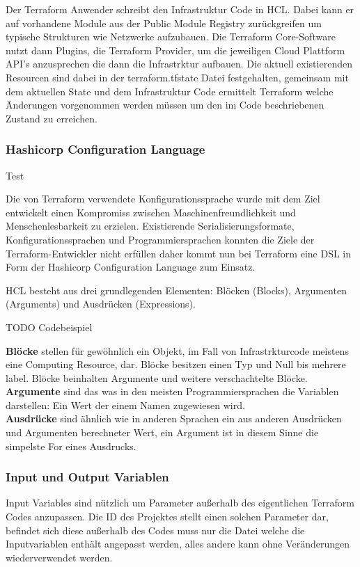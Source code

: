 \begin{spacing}{1.2}
Der Terraform Anwender schreibt den Infrastruktur Code in HCL. Dabei kann
er auf vorhandene Module aus der Public Module Registry zurückgreifen um
typische Strukturen wie Netzwerke aufzubauen. Die Terraform Core-Software
nutzt dann Plugins, die Terraform Provider, um die jeweiligen Cloud Plattform
API's anzusprechen die dann die Infrastrktur aufbauen. Die aktuell
existierenden Resourcen sind dabei in der terraform.tfstate Datei
festgehalten, gemeinsam mit dem aktuellen State und dem Infrastruktur Code
ermittelt Terraform welche Änderungen vorgenommen werden müssen um den
im Code beschriebenen Zustand zu erreichen.

\subsubsection{Hashicorp Configuration Language}

Test

Die von Terraform verwendete Konfigurationssprache wurde mit dem Ziel
entwickelt einen Kompromiss zwischen Maschinenfreundlichkeit und
Menschenlesbarkeit zu erzielen. Existierende Serialisierungsformate,
Konfigurationssprachen und Programmiersprachen konnten die Ziele
der Terraform-Entwickler nicht erfüllen daher kommt nun bei Terraform
eine DSL in Form der Hashicorp Configuration Language zum Einsatz.

HCL besteht aus drei grundlegenden Elementen: Blöcken (Blocks), Argumenten
(Arguments) und Ausdrücken (Expressions).

TODO Codebeispiel

\textbf{Blöcke} stellen für gewöhnlich ein Objekt, im Fall von
Infrastrkturcode meistens eine Computing Resource, dar.
Blöcke besitzen einen Typ und Null bis mehrere label. Blöcke beinhalten
Argumente und weitere verschachtelte Blöcke.\\
\textbf{Argumente} sind das was in den meisten Programmiersprachen die
Variablen darstellen: Ein Wert der einem Namen zugewiesen wird.\\
\textbf{Ausdrücke} sind ähnlich wie in anderen Sprachen ein aus anderen
Ausdrücken und Argumenten berechneter Wert, ein Argument ist in diesem Sinne
die simpelste For eines Ausdrucks.

\subsubsection{Input und Output Variablen}

Input Variables sind nützlich um Parameter außerhalb des eigentlichen
Terraform Codes anzupassen. Die ID des Projektes stellt einen solchen
Parameter dar, befindet sich diese außerhalb des Codes muss nur die Datei
welche die Inputvariablen enthält angepasst werden, alles andere kann ohne
Veränderungen wiederverwendet werden.


\end{spacing}
